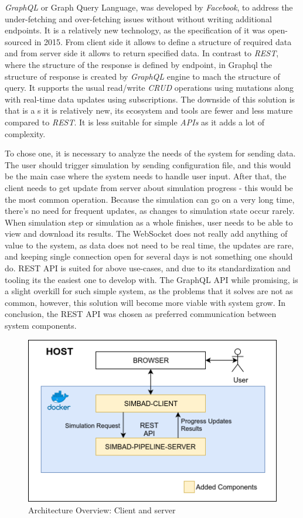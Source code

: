 \textit{GraphQL} or Graph Query Language, was developed by \textit{Facebook}, to address the under-fetching and over-fetching issues without without writing additional endpoints. It is a relatively new technology, as the specification of it was open-sourced in 2015. From client side it allows to define a structure of required data and from server side it allows to return specified data. In contrast to \textit{REST}, where the structure of the response is defined by endpoint, in Graphql the structure of response is created by \textit{GraphQL} engine to mach the structure of query. It supports the usual read/write \textit{CRUD} operations using mutations along with real-time data updates using subscriptions. The downside of this solution is that is a s it is relatively new, its ecosystem and tools are fewer and less mature compared to \textit{REST}. It is less suitable for simple \textit{APIs} as it adds a lot of complexity.

To chose one, it is necessary to analyze the needs of the system for sending data. The user should trigger simulation by sending configuration file, and this would be the main case where the system needs to handle user input. After that, the client needs to get update from server about simulation progress - this would be the most common operation. Because the simulation can go on a very long time, there's no need for frequent updates, as changes to simulation state occur rarely. When simulation step or simulation as a whole finishes, user needs to be able to view and download its results. The WebSocket does not really add anything of value to the system, as data does not need to be real time, the updates are rare, and keeping single connection open for several days is not something one should do. REST API is suited for above use-cases, and due to its standardization and tooling its the easiest one to develop with. The GraphQL API while promising, is a slight overkill for such simple system, as the problems that it solves are not as common, however, this solution will become more viable with system grow. In conclusion, the REST API was chosen as preferred communication between system components. 
\begin{figure}[h!]
	\centering
		\includegraphics[width=0.9\linewidth]{diagrams/arch2.png}
	\caption{Architecture Overview: Client and server}
	\label{fig:arch2}
\end{figure}
\newpage 
